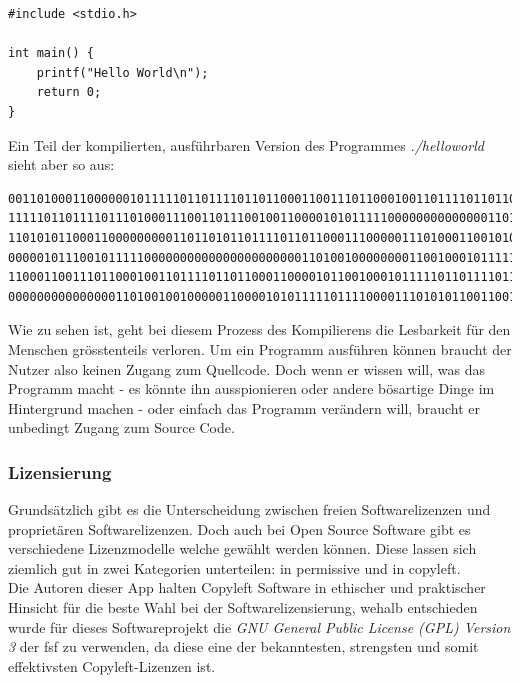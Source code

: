 \documentclass[a4paper,11pt]{article}
\begin{document}
\lstset{language=C}
\begin{lstlisting}
#include <stdio.h>

int main() {
    printf("Hello World\n");
    return 0;
}
\end{lstlisting}
Ein Teil der kompilierten, ausführbaren Version des Programmes \textit{./helloworld} sieht aber so aus:
\begin{lstlisting}
0011010001100000010111110110111101101100011001110110001001101111011011000110000101100100
1111101101111011101000111001101110010011000010101111100000000000000110100011100000111100
1101010110001100000000011011010110111101101100011100000111010001100101011001000110010100
0000010111001011111000000000000000000000011010010000000011001000101111101011111011011110
1100011001110110001001101111011011000110000101100100010111110110111101110100011100110111
0000000000000001101001001000001100001010111110111100001110101011001100101111101101110011
\end{lstlisting}

Wie zu sehen ist, geht bei diesem Prozess des Kompilierens die Lesbarkeit für den Menschen grösstenteils verloren. Um ein Programm ausführen können braucht der Nutzer also keinen Zugang zum Quellcode. Doch wenn er wissen will, was das Programm macht - es könnte ihn ausspionieren oder andere bösartige Dinge im Hintergrund machen - oder einfach das Programm verändern will, braucht er unbedingt Zugang zum Source Code.\\

\subsubsection{Lizensierung}
Grundsätzlich gibt es die  Unterscheidung zwischen freien Softwarelizenzen und proprietären Softwarelizenzen. Doch auch bei Open Source Software gibt es verschiedene Lizenzmodelle welche gewählt werden können. Diese lassen sich ziemlich gut in zwei Kategorien unterteilen: in \gls{permissive} und in \gls{copyleft}.\\

Die Autoren dieser App halten Copyleft Software in ethischer und praktischer Hinsicht für die beste Wahl bei der Softwarelizensierung, wehalb entschieden wurde für dieses Softwareprojekt die \textit{GNU General Public License (GPL) Version 3} \cite{GPLv3} der \gls{fsf} zu verwenden, da diese eine der bekanntesten, strengsten und somit effektivsten Copyleft-Lizenzen ist.
\end{document}
